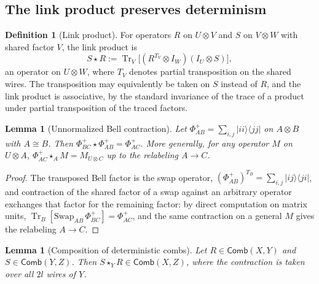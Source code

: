 \documentclass[11pt,a4paper]{article}
\theoremstyle{definition}
\newtheorem{definition}{Definition}[section]
\theoremstyle{plain}
\newtheorem{lemma}[theorem]{Lemma}
\theoremstyle{remark}
\DeclareMathOperator{\Tr}{Tr}
\newcommand{\Comb}{\mathsf{Comb}}
\begin{document}
\subsection{The link product preserves determinism}
\label{ao:linkprod}

\begin{definition}[Link product]
For operators $R$ on $U\otimes V$ and $S$ on $V\otimes W$ with shared factor
$V$, the link product is
\[
S\star R := \Tr_{V}\!\bigl[(R^{T_V}\otimes I_W)(I_U\otimes S)\bigr],
\]
an operator on $U\otimes W$, where $T_V$ denotes partial transposition on
the shared wires. The transposition may equivalently be taken on $S$
instead of $R$, and the link product is associative, by the standard
invariance of the trace of a product under partial transposition of the
traced factors.
\end{definition}

\begin{lemma}[Unnormalized Bell contraction]
\label{ao:snake}
Let $\Phi^+_{AB}=\sum_{i,j}|i i\rangle\langle j j|$ on $A\otimes B$ with
$A\cong B$. Then $\Phi^+_{BC}\star\Phi^+_{AB}=\Phi^+_{AC}$. More generally,
for any operator $M$ on $U\otimes A$,
$\Phi^+_{AC}\star_{A} M=M_{U\otimes C}$ up to the relabeling $A\to C$.
\end{lemma}

\begin{proof}
The transposed Bell factor is the swap operator,
$(\Phi^+_{AB})^{T_B}=\sum_{i,j}|ij\rangle\langle ji|$, and contraction of
the shared factor of a swap against an arbitrary operator exchanges that
factor for the remaining factor: by direct computation on matrix units,
$\Tr_B[\mathrm{Swap}_{AB}\,\Phi^+_{BC}]=\Phi^+_{AC}$, and the same
contraction on a general $M$ gives the relabeling $A\to C$.
\end{proof}

\begin{lemma}[Composition of deterministic combs]
\label{ao:gluing}
Let $R\in\Comb(X,Y)$ and $S\in\Comb(Y,Z)$. Then
$S\star_Y R\in\Comb(X,Z)$, where the contraction is taken over all $2l$
wires of $Y$.
\end{lemma}
\end{document}
